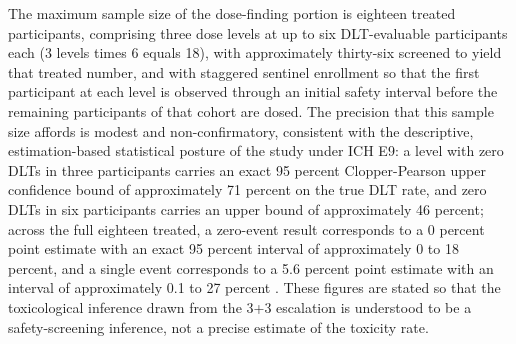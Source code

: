 The maximum sample size of the dose-finding portion is eighteen treated
participants, comprising three dose levels at up to six DLT-evaluable participants
each (3 levels times 6 equals 18), with approximately thirty-six screened to yield
that treated number, and with staggered sentinel enrollment so that the first
participant at each level is observed through an initial safety interval before the
remaining participants of that cohort are dosed. The precision that this sample
size affords is modest and non-confirmatory, consistent with the descriptive,
estimation-based statistical posture of the study under ICH E9: a level with zero
DLTs in three participants carries an exact 95 percent Clopper-Pearson upper
confidence bound of approximately 71 percent on the true DLT rate, and zero DLTs in
six participants carries an upper bound of approximately 46 percent; across the full
eighteen treated, a zero-event result corresponds to a 0 percent point estimate with
an exact 95 percent interval of approximately 0 to 18 percent, and a single event
corresponds to a 5.6 percent point estimate with an interval of approximately 0.1 to
27 percent \cite{onpremwhippl}. These figures are stated so that the toxicological
inference drawn from the 3+3 escalation is understood to be a safety-screening
inference, not a precise estimate of the toxicity rate.

\clearpage

